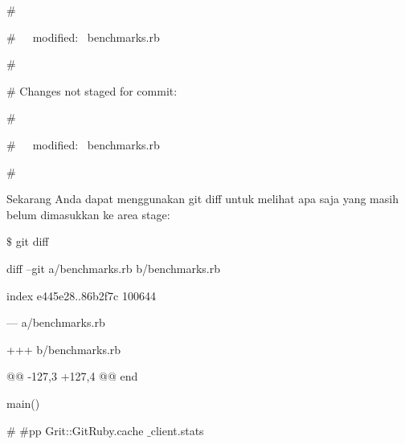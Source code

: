 \noindent 
{\fontsize{14pt}{14pt}\selectfont  $  \#  $ \\} \par
\noindent 
{\fontsize{14pt}{14pt}\selectfont  $  \#  $~~~modified:~  benchmarks.rb \\} \par
\noindent 
{\fontsize{14pt}{14pt}\selectfont  $  \#  $ \\} \par
\noindent 
{\fontsize{14pt}{14pt}\selectfont  $  \#  $ Changes not staged for commit: \\} \par
\noindent 
{\fontsize{14pt}{14pt}\selectfont  $  \#  $ \\} \par
\noindent 
{\fontsize{14pt}{14pt}\selectfont  $  \#  $~~~modified:~  benchmarks.rb \\} \par
\noindent 
{\fontsize{14pt}{14pt}\selectfont  $  \#  $ \\} \par
\noindent 
{\fontsize{14pt}{14pt}\selectfont Sekarang Anda dapat menggunakan $  $git diff $  $untuk melihat apa saja yang masih belum dimasukkan ke area stage: \\} \par
\vspace{14pt}
\noindent 
{\fontsize{14pt}{14pt}\selectfont  $  \$  $ git diff \\} \par
\noindent 
{\fontsize{14pt}{14pt}\selectfont diff --git a/benchmarks.rb b/benchmarks.rb \\} \par
\noindent 
{\fontsize{14pt}{14pt}\selectfont index e445e28..86b2f7c 100644 \\} \par
\noindent 
{\fontsize{14pt}{14pt}\selectfont --- a/benchmarks.rb \\} \par
\noindent 
{\fontsize{14pt}{14pt}\selectfont +++ b/benchmarks.rb \\} \par
\noindent 
{\fontsize{14pt}{14pt}\selectfont @@ -127,3 +127,4 @@ end \\} \par
\noindent 
{\fontsize{14pt}{14pt}\selectfont main() \\} \par
\vspace{14pt}
\noindent 
{\fontsize{14pt}{14pt}\selectfont  $  \#  $ $  \#  $pp Grit::GitRuby.cache $  \_  $client.stats \\} \par
